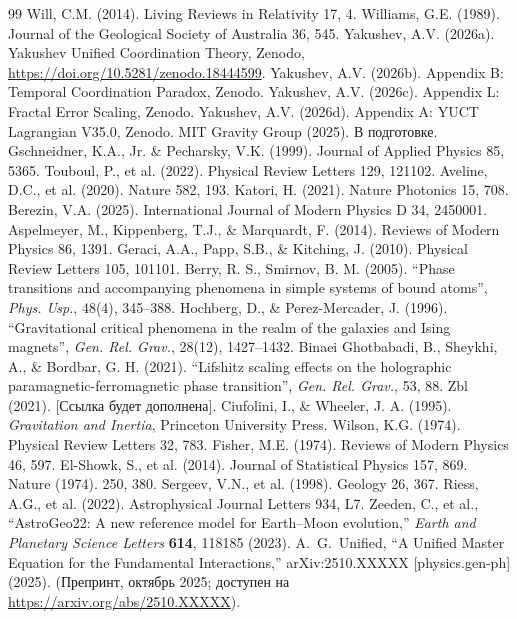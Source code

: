 \documentclass[12pt]{article}
\theoremstyle{remark}
\begin{document}
\begin{thebibliography}{99}
		 Will, C.M. (2014). Living Reviews in Relativity 17, 4.
		 Williams, G.E. (1989). Journal of the Geological Society of Australia 36, 545.
		 Yakushev, A.V. (2026a). Yakushev Unified Coordination Theory, Zenodo, \url{https://doi.org/10.5281/zenodo.18444599}.
		 Yakushev, A.V. (2026b). Appendix B: Temporal Coordination Paradox, Zenodo.
		 Yakushev, A.V. (2026c). Appendix L: Fractal Error Scaling, Zenodo.
		 Yakushev, A.V. (2026d). Appendix A: YUCT Lagrangian V35.0, Zenodo.
		 MIT Gravity Group (2025). В подготовке.
		 Gschneidner, K.A., Jr. \& Pecharsky, V.K. (1999). Journal of Applied Physics 85, 5365.
		 Touboul, P., et al. (2022). Physical Review Letters 129, 121102.
		 Aveline, D.C., et al. (2020). Nature 582, 193.
		 Katori, H. (2021). Nature Photonics 15, 708.
		 Berezin, V.A. (2025). International Journal of Modern Physics D 34, 2450001.
		 Aspelmeyer, M., Kippenberg, T.J., \& Marquardt, F. (2014). Reviews of Modern Physics 86, 1391.
		 Geraci, A.A., Papp, S.B., \& Kitching, J. (2010). Physical Review Letters 105, 101101.
		 Berry, R. S., Smirnov, B. M. (2005). ``Phase transitions and accompanying phenomena in simple systems of bound atoms'', \textit{Phys. Usp.}, 48(4), 345–388.
		 Hochberg, D., \& Perez-Mercader, J. (1996). ``Gravitational critical phenomena in the realm of the galaxies and Ising magnets'', \textit{Gen. Rel. Grav.}, 28(12), 1427–1432.
		 Binaei Ghotbabadi, B., Sheykhi, A., \& Bordbar, G. H. (2021). ``Lifshitz scaling effects on the holographic paramagnetic-ferromagnetic phase transition'', \textit{Gen. Rel. Grav.}, 53, 88.
		 Zbl (2021). [Ссылка будет дополнена].
		 Ciufolini, I., \& Wheeler, J. A. (1995). \textit{Gravitation and Inertia}, Princeton University Press.
		 Wilson, K.G. (1974). Physical Review Letters 32, 783.
		 Fisher, M.E. (1974). Reviews of Modern Physics 46, 597.
		 El-Showk, S., et al. (2014). Journal of Statistical Physics 157, 869.
		 Nature (1974). 250, 380.
		 Sergeev, V.N., et al. (1998). Geology 26, 367.
		 Riess, A.G., et al. (2022). Astrophysical Journal Letters 934, L7.
		 Zeeden, C., et al., ``AstroGeo22: A new reference model for Earth–Moon evolution,'' \emph{Earth and Planetary Science Letters} \textbf{614}, 118185 (2023).
		A.~G.~Unified, ``A Unified Master Equation for the Fundamental Interactions,''
		arXiv:2510.XXXXX [physics.gen-ph] (2025).
		(Препринт, октябрь 2025; доступен на \url{https://arxiv.org/abs/2510.XXXXX}).
		

\end{thebibliography}
\end{document}
